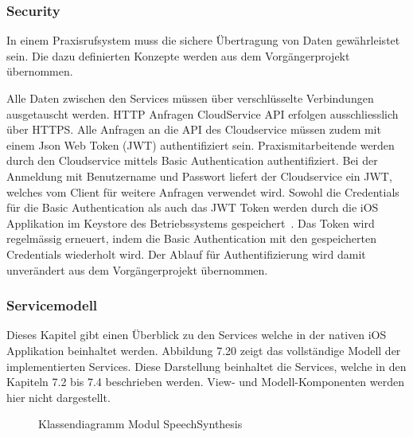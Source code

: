 \subsubsection{Security}

In einem Praxisrufsystem muss die sichere Übertragung von Daten gewährleistet sein.
Die dazu definierten Konzepte werden aus dem Vorgängerprojekt übernommen.

Alle Daten zwischen den Services müssen über verschlüsselte Verbindungen ausgetauscht werden.
HTTP Anfragen CloudService API erfolgen ausschliesslich über HTTPS\@.
Alle Anfragen an die API des Cloudservice müssen zudem mit einem Json Web Token (JWT) authentifiziert sein.
Praxismitarbeitende werden durch den Cloudservice mittels Basic Authentication authentifiziert.
Bei der Anmeldung mit Benutzername und Passwort liefert der Cloudservice ein JWT, welches vom Client für weitere Anfragen verwendet wird.
Sowohl die Credentials für die Basic Authentication als auch das JWT Token werden durch die iOS Applikation im Keystore des Betriebssystems gespeichert~\cite{ip5}.
Das Token wird regelmässig erneuert, indem die Basic Authentication mit den gespeicherten Credentials wiederholt wird.
Der Ablauf für Authentifizierung wird damit unverändert aus dem Vorgängerprojekt übernommen.

\subsubsection{Servicemodell}

Dieses Kapitel gibt einen Überblick zu den Services welche in der nativen iOS Applikation beinhaltet werden.
Abbildung 7.20 zeigt das vollständige Modell der implementierten Services.
Diese Darstellung beinhaltet die Services, welche in den Kapiteln 7.2 bis 7.4 beschrieben werden.
View- und Modell-Komponenten werden hier nicht dargestellt.

\begin{figure}[h]
    \centering
    \begin{minipage}[b]{1\textwidth}
        \caption{Klassendiagramm Modul SpeechSynthesis}
    \end{minipage}
\end{figure}

\clearpage
